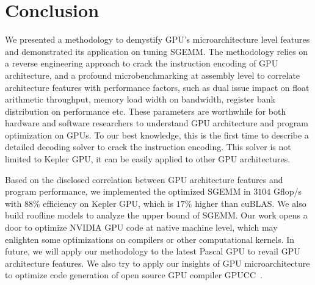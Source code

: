 \section{Conclusion}
\label{sec:conclusion}
We presented a methodology to demystify GPU's microarchitecture level features and demonstrated its 
application on tuning SGEMM. The methodology relies on a reverse engineering approach to crack the instruction encoding 
of GPU architecture, and a profound microbenchmarking at assembly level to correlate architecture features with 
performance factors, such as dual issue impact on float arithmetic throughput, memory load width on bandwidth, register 
bank distribution on performance etc. These parameters are worthwhile for both hardware and software researchers to 
understand GPU architecture and program optimization on GPUs. To our best knowledge, this is the 
first time to describe a detailed decoding solver to crack the instruction encoding. 
This solver is not limited to Kepler GPU, it can be easily applied to other GPU architectures. %

Based on the disclosed correlation between GPU architecture features and program performance, we implemented the
optimized SGEMM in $3104$ Gflop/s with $88\%$ efficiency on Kepler GPU, which is $17\%$ higher than cuBLAS. 
We also build roofline models to analyze the upper bound of SGEMM.
Our work opens a door to optimize NVIDIA GPU code at native machine level, which may enlighten some optimizations on compilers or other computational kernels.
In future, we will apply our methodology to the latest Pascal GPU to revail GPU architecture features.
We also try to apply our insights of GPU microarchitecture to optimize code generation of open source GPU compiler
GPUCC~\cite{wu2016gpucc}.
